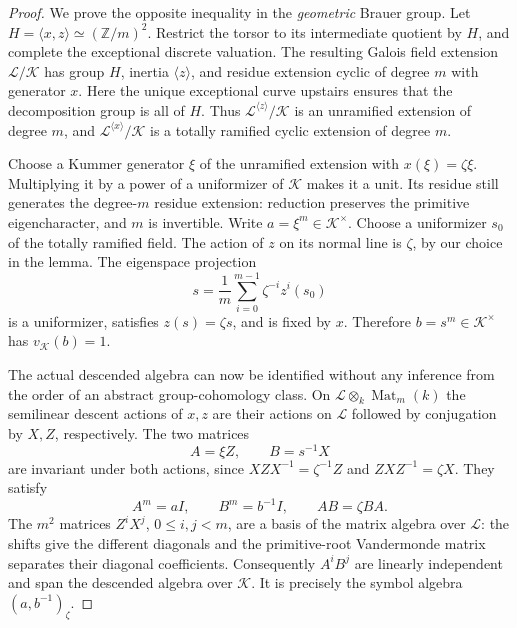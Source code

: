 \begin{proof}
We prove the opposite inequality in the \emph{geometric}
Brauer group. Let $H=\langle x,z\rangle\simeq(\mathbb Z/m)^2$.
Restrict the torsor to its intermediate quotient by $H$,
and complete the exceptional discrete valuation.
The resulting Galois field extension $\mathcal L/\mathcal K$
has group $H$, inertia $\langle z\rangle$, and residue
extension cyclic of degree $m$ with generator $x$.
Here the unique exceptional curve upstairs ensures that
the decomposition group is all of $H$.
Thus $\mathcal L^{\langle z\rangle}/\mathcal K$ is an
unramified extension of degree $m$, and
$\mathcal L^{\langle x\rangle}/\mathcal K$ is a totally
ramified cyclic extension of degree $m$.

Choose a Kummer generator $\xi$ of the unramified extension
with $x(\xi)=\zeta\xi$. Multiplying it by a power of a
uniformizer of $\mathcal K$ makes it a unit. Its residue
still generates the degree-$m$ residue extension: reduction
preserves the primitive eigencharacter, and $m$ is invertible.
Write $a=\xi^m\in\mathcal K^\times$.
Choose a uniformizer $s_0$ of the totally ramified field.
The action of $z$ on its normal line is $\zeta$, by our
choice in the lemma. The eigenspace projection
\[
       s=\frac1m\sum_{i=0}^{m-1}\zeta^{-i}z^i(s_0)
                                                               \tag{D.EC.12}
\]
is a uniformizer, satisfies $z(s)=\zeta s$, and is fixed
by $x$. Therefore $b=s^m\in\mathcal K^\times$ has
$v_{\mathcal K}(b)=1$.

The actual descended algebra can now be identified without
any inference from the order of an abstract group-cohomology
class. On $\mathcal L\otimes_k\operatorname{Mat}_m(k)$ the
semilinear descent actions of $x,z$ are their actions on
$\mathcal L$ followed by conjugation by $X,Z$, respectively.
The two matrices
\[
             A=\xi Z,\qquad B=s^{-1}X
                                                               \tag{D.EC.13}
\]
are invariant under both actions, since
$XZX^{-1}=\zeta^{-1}Z$ and $ZXZ^{-1}=\zeta X$.
They satisfy
\[
             A^m=aI,\qquad B^m=b^{-1}I,
                       \qquad AB=\zeta BA.             \tag{D.EC.14}
\]
The $m^2$ matrices $Z^iX^j$, $0\le i,j<m$, are a basis
of the matrix algebra over $\mathcal L$: the shifts give
the different diagonals and the primitive-root Vandermonde
matrix separates their diagonal coefficients.
Consequently $A^iB^j$ are linearly independent and span
the descended algebra over $\mathcal K$.
It is precisely the symbol algebra $(a,b^{-1})_\zeta$.


\end{proof}
